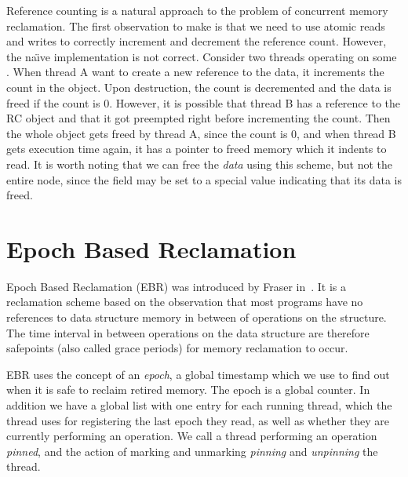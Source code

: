 \documentclass[b5paper,twoside]{report}
\begin{document}
Reference counting is a natural approach to the problem of concurrent memory reclamation.
The first observation to make is that we need to use atomic reads and writes
to correctly increment and decrement the reference count. However,
the na\"\i{}ve implementation is not correct.
Consider two threads operating on some .
When thread A want to create a new reference to the data, it increments the count in
the  object. Upon destruction, the count is decremented
and the data is freed if the count is 0.
However, it is possible that thread B has a reference to the RC object
and that it got preempted right before incrementing the count.
Then the whole object gets freed by thread A, since the count is 0,
and when thread B gets execution time again, it has a pointer to freed memory
which it indents to read.
It is worth noting that we can free the \emph{data} using this scheme, but not
the entire  node, since the  field may be set to a special
value indicating that its data is freed.



%

\section{Epoch Based Reclamation}
Epoch Based Reclamation (EBR) was introduced by Fraser in~\cite{fraser2004practical}.
It is a reclamation scheme based on the observation that most programs have no
references to data structure memory in between of operations on the structure.
The time interval in between operations on the data structure are therefore
safepoints (also called grace periods) for memory reclamation to occur.

EBR uses the concept of an \emph{epoch}, a global timestamp which we
use to find out when it is safe to reclaim retired memory.
The epoch is a global counter.
In addition we have a global list with one entry for each running thread,
which the thread uses for registering the last epoch they read, as well as
whether they are currently performing an operation.
We call a thread performing an operation \emph{pinned}, and the action of
marking and unmarking \emph{pinning} and \emph{unpinning} the thread.
\end{document}
